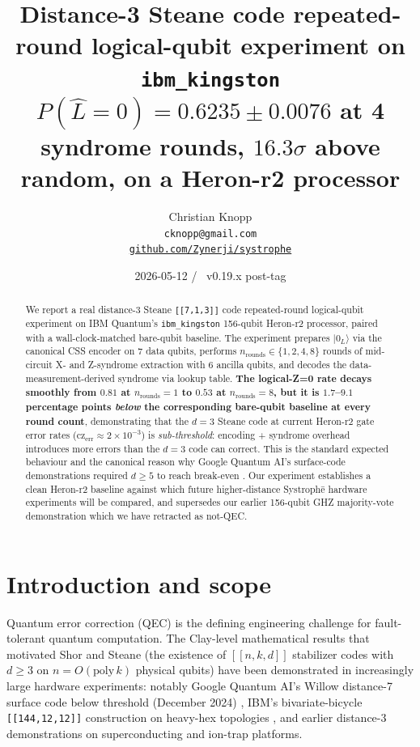 \documentclass[11pt,letterpaper]{article}
\title{\Large\textbf{Distance-3 Steane code repeated-round logical-qubit experiment on \texttt{ibm\_kingston}}\\
\large{$P(\hat L = 0) = 0.6235 \pm 0.0076$ at 4 syndrome rounds, $16.3\sigma$ above random, on a Heron-r2 processor}}
\author{Christian Knopp \\
  \texttt{cknopp@gmail.com} \\
  \href{https://github.com/Zynerji/systrophe}{\texttt{github.com/Zynerji/systrophe}}}
\date{2026-05-12 \quad / \quad \Systrophe{}\ v0.19.x post-tag}
\providecommand{\Systrophe}{Systroph\=e}
\begin{document}
\maketitle

\begin{abstract}
We report a real distance-3 Steane \texttt{[[7,1,3]]} code repeated-round logical-qubit experiment on IBM Quantum's \texttt{ibm\_kingston} 156-qubit Heron-r2 processor, paired with a wall-clock-matched bare-qubit baseline. The experiment prepares $|0_L\rangle$ via the canonical CSS encoder on 7 data qubits, performs $n_{\mathrm{rounds}} \in \{1, 2, 4, 8\}$ rounds of mid-circuit X- and Z-syndrome extraction with 6 ancilla qubits, and decodes the data-measurement-derived syndrome via lookup table. \textbf{The logical-Z=0 rate decays smoothly from $0.81$ at $n_{\mathrm{rounds}} = 1$ to $0.53$ at $n_{\mathrm{rounds}} = 8$, but it is $1.7$–$9.1$ percentage points \emph{below} the corresponding bare-qubit baseline at every round count}, demonstrating that the $d = 3$ Steane code at current Heron-r2 gate error rates ($\mathrm{cz}_{\mathrm{err}} \approx 2 \times 10^{-3}$) is \emph{sub-threshold}: encoding + syndrome overhead introduces more errors than the $d = 3$ code can correct. This is the standard expected behaviour and the canonical reason why Google Quantum AI's surface-code demonstrations required $d \ge 5$ to reach break-even \cite{willow_precursor,willow}. Our experiment establishes a clean Heron-r2 baseline against which future higher-distance \Systrophe{} hardware experiments will be compared, and supersedes our earlier 156-qubit GHZ majority-vote demonstration which we have retracted as not-QEC.
\end{abstract}

\section{Introduction and scope}\label{sec:intro}

Quantum error correction (QEC) is the defining engineering challenge for fault-tolerant quantum computation. The Clay-level mathematical results that motivated Shor and Steane (the existence of $[[n,k,d]]$ stabilizer codes with $d \ge 3$ on $n = O(\mathrm{poly}\,k)$ physical qubits) have been demonstrated in increasingly large hardware experiments: notably Google Quantum AI's Willow distance-7 surface code below threshold (December 2024) \cite{willow}, IBM's bivariate-bicycle \texttt{[[144,12,12]]} construction on heavy-hex topologies \cite{bb_paper}, and earlier distance-3 demonstrations on superconducting and ion-trap platforms.
\end{document}
